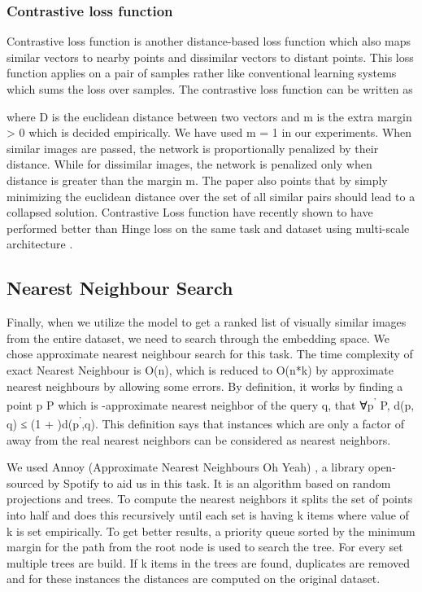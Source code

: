 \documentclass[10pt,twocolumn,letterpaper]{article}
\begin{document}
\subsubsection{Contrastive loss function}
Contrastive loss function \cite{c23} is another distance-based loss function which also maps similar vectors to nearby points and dissimilar vectors to distant points. This loss function applies on a pair of samples rather like conventional learning systems which sums the loss over samples. The contrastive loss function can be written as


where D is the euclidean distance between two vectors and m is the extra margin > 0 which is decided empirically. We have used m = 1 in our experiments.
When similar images are passed, the network is proportionally penalized by their distance. While for dissimilar images, the network is penalized only when distance is greater than the margin m. The paper also points that by simply minimizing the euclidean distance over the set of all similar pairs should lead to a collapsed solution. Contrastive Loss function have recently shown to have performed better than Hinge loss on the same task and dataset using multi-scale architecture \cite{c3}.

\subsection{Nearest Neighbour Search}
Finally, when we utilize the model to get a ranked list of visually similar images from the entire dataset, we need to search through the embedding space. We chose approximate nearest neighbour search for this task. The time complexity of exact Nearest Neighbour is O(n), which is reduced to O(n*k) by approximate nearest neighbours by allowing some errors. By definition, it works by finding a point p  P which is -approximate nearest neighbor of the query q, that ∀p\textsuperscript{'}  P, d(p, q) ≤ (1 + )d(p\textsuperscript{'},q). This definition says that instances which are only a factor of  away from the real nearest neighbors can be considered as nearest neighbors.

We used Annoy (Approximate Nearest Neighbours Oh Yeah) \cite{c32,c33}, a library open-sourced by Spotify to aid us in this task. It is an algorithm based on random projections and trees. To compute the nearest neighbors it splits the set of points into half and does this recursively until each set is having k items where value of k is set empirically. To get better results, a priority queue sorted by the minimum margin for the path from the root node is used to search the tree. For every set multiple trees are build. If k items in the trees are found, duplicates are removed and for these instances the distances are computed on the original dataset.
\end{document}
